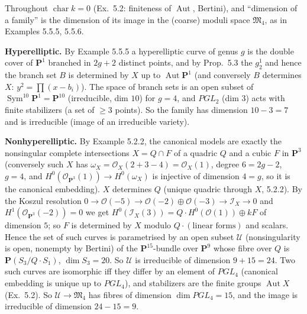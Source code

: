 \documentclass[11pt]{article}
\begin{document}
\pf
Throughout $\operatorname{char}k=0$ (Ex.~5.2: finiteness of $\operatorname{Aut}$, Bertini), and ``dimension of a family'' is the dimension of its image in the (coarse) moduli space $\mathfrak M_4$, as in Examples 5.5.5, 5.5.6.

\textbf{Hyperelliptic.} By Example 5.5.5 a hyperelliptic curve of genus $g$ is the double cover of $\mathbf P^1$ branched in $2g+2$ distinct points, and by Prop.~5.3 the $g^1_2$ and hence the branch set $B$ is determined by $X$ up to $\operatorname{Aut}\mathbf P^1$ (and conversely $B$ determines $X$: $y^2=\prod(x-b_i)$). The space of branch sets is an open subset of $\operatorname{Sym}^{10}\mathbf P^1=\mathbf P^{10}$ (irreducible, dim $10$) for $g=4$, and $PGL_2$ (dim 3) acts with finite stabilizers (a set of $\ge3$ points). So the family has dimension $10-3=7$ and is irreducible (image of an irreducible variety).

\textbf{Nonhyperelliptic.} By Example 5.2.2, the canonical models are exactly the nonsingular complete intersections $X=Q\cap F$ of a quadric $Q$ and a cubic $F$ in $\mathbf P^3$ (conversely such $X$ has $\omega_X=\mathcal O_X(2+3-4)=\mathcal O_X(1)$, degree $6=2g-2$, $g=4$, and $H^0(\mathcal O_{\mathbf P^3}(1))\to H^0(\omega_X)$ is injective of dimension $4=g$, so it is the canonical embedding). $X$ determines $Q$ (unique quadric through $X$, 5.2.2). By the Koszul resolution $0\to\mathcal O(-5)\to\mathcal O(-2)\oplus\mathcal O(-3)\to\mathcal I_X\to0$ and $H^1(\mathcal O_{\mathbf P^3}(-2))=0$ we get $H^0(\mathcal I_X(3))=Q\cdot H^0(\mathcal O(1))\oplus kF$ of dimension $5$; so $F$ is determined by $X$ modulo $Q\cdot(\text{linear forms})$ and scalars. Hence the set of such curves is parametrised by an open subset $\mathcal U$ (nonsingularity is open, nonempty by Bertini) of the $\mathbf P^{15}$-bundle over $\mathbf P^9$ whose fibre over $Q$ is $\mathbf P(S_3/Q\cdot S_1)$, $\dim S_3=20$. So $\mathcal U$ is irreducible of dimension $9+15=24$. Two such curves are isomorphic iff they differ by an element of $PGL_4$ (canonical embedding is unique up to $PGL_4$), and stabilizers are the finite groups $\operatorname{Aut}X$ (Ex.~5.2). So $\mathcal U\to\mathfrak M_4$ has fibres of dimension $\dim PGL_4=15$, and the image is irreducible of dimension $24-15=9$.
\end{document}
